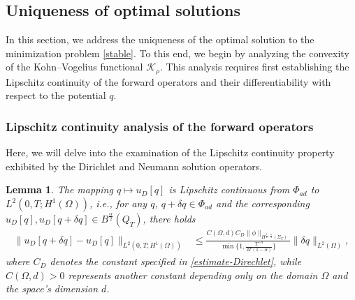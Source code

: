 \documentclass[a4paper,12pt,reqno,natbib]{amsart}
\newtheorem{lemma}[theorem]{Lemma}
\def\K{\mathcal K}
\begin{document}
\subsection{Uniqueness of optimal solutions}\label{sec:77}
In this section, we address the uniqueness of the optimal solution to the minimization problem \eqref{stable}. To this end, we begin by analyzing the convexity of the Kohn–Vogelius functional $\K_\rho$. This analysis requires first establishing the Lipschitz continuity of the forward operators and their differentiability with respect to the potential $q$.


\subsubsection{\bf Lipschitz continuity analysis of the forward operators}


Here, we will delve into the examination of the Lipschitz continuity property exhibited by the Dirichlet and Neumann solution operators.





\begin{lemma}\label{lemma-L-C-D}
The mapping $q\longmapsto u_D[q]$ is Lipschitz continuous from $\Phi_{ad}$ to $L^2(0,T;H^1(\Omega))$, i.e., for any $q$, $q+\delta q \in \Phi_{ad}$ and the corresponding $u_D[q], u_D[q+\delta q] \in B^{\frac{\alpha}{2}}(Q_T)$, there holds
\begin{align} \label{lip_D}
    \| u_D[q + \delta q] - u_D[q]\|_{L^2(0,T;H^1(\Omega))}&\leq \frac{C(\Omega,d)C_D\|\phi\|_{H^{\frac{1}{2}, \frac{\alpha}{4} }(\Sigma_T)}}{\min\{1,\frac{T^{-\alpha}}{2\Gamma(1-\alpha)}\}}
\|\delta q\|_{L^2(\Omega)},
\end{align}
where $C_D$ denotes the constant specified in \eqref{estimate-Direchlet}, while $C(\Omega,d)>0$ represents another constant depending only on the domain $\Omega$ and the space's dimension $d$.
\end{lemma}
\end{document}
